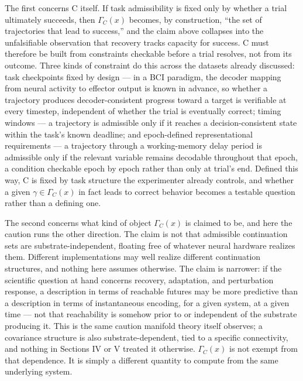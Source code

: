 \documentclass[11pt]{article}
\begin{document}
The first concerns C itself. If task admissibility is fixed only by whether a trial ultimately succeeds, then $\Gamma_C(x)$ becomes, by construction, ``the set of trajectories that lead to success,'' and the claim above collapses into the unfalsifiable observation that recovery tracks capacity for success. C must therefore be built from constraints checkable before a trial resolves, not from its outcome. Three kinds of constraint do this across the datasets already discussed: task checkpoints fixed by design — in a BCI paradigm, the decoder mapping from neural activity to effector output is known in advance, so whether a trajectory produces decoder-consistent progress toward a target is verifiable at every timestep, independent of whether the trial is eventually correct; timing windows — a trajectory is admissible only if it reaches a decision-consistent state within the task's known deadline; and epoch-defined representational requirements — a trajectory through a working-memory delay period is admissible only if the relevant variable remains decodable throughout that epoch, a condition checkable epoch by epoch rather than only at trial's end. Defined this way, C is fixed by task structure the experimenter already controls, and whether a given $\gamma \in \Gamma_C(x)$ in fact leads to correct behavior becomes a testable question rather than a defining one.

The second concerns what kind of object $\Gamma_C(x)$ is claimed to be, and here the caution runs the other direction. The claim is not that admissible continuation sets are substrate-independent, floating free of whatever neural hardware realizes them. Different implementations may well realize different continuation structures, and nothing here assumes otherwise. The claim is narrower: if the scientific question at hand concerns recovery, adaptation, and perturbation response, a description in terms of reachable futures may be more predictive than a description in terms of instantaneous encoding, for a given system, at a given time — not that reachability is somehow prior to or independent of the substrate producing it. This is the same caution manifold theory itself observes; a covariance structure is also substrate-dependent, tied to a specific connectivity, and nothing in Sections IV or V treated it otherwise. $\Gamma_C(x)$ is not exempt from that dependence. It is simply a different quantity to compute from the same underlying system.
\end{document}
